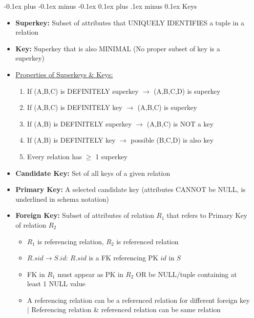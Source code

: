 \documentclass[landscape]{article}
\makeatletter
\renewcommand{\subsection}{\@startsection{subsection}{2}{0mm}%
  {-0.1ex plus -0.1ex minus -0.1ex}%
  {0.1ex plus .1ex minus 0.1ex}%
{\normalfont\scriptsize\bfseries}}
\makeatother
\begin{document}
\begin{multicols*}{5}
    \subsection{Keys}
    \begin{itemize}
      \item \textbf{Superkey:} Subset of attributes that UNIQUELY IDENTIFIES  a tuple in a relation
      \item \textbf{Key:} Superkey that is also MINIMAL (No proper subset of key is a superkey)
      \item \underline{Properties of Superkeys \& Keys:}
      \begin{enumerate}
        \item If (A,B,C) is DEFINITELY superkey $\rightarrow$ (A,B,C,D) is superkey
        \item If (A,B,C) is DEFINITELY key $\rightarrow$ (A,B,C) is superkey
        \item If (A,B) is DEFINITELY superkey $\rightarrow$ (A,B,C) is NOT a key
        \item If (A,B) is DEFINITELY key $\rightarrow$ possible (B,C,D) is also key
        \item Every relation has $\geq$ 1 superkey
      \end{enumerate}
      \item \textbf{Candidate Key:} Set of all keys of a given relation
      \item \textbf{Primary Key:} A selected candidate key (attributes CANNOT be NULL, is underlined in schema notation)
      \item \textbf{Foreign Key:} Subset of attributes of relation $R_1$ that refers to Primary Key of relation $R_2$
      \begin{itemize}
        \item $R_1$ is referencing relation, $R_2$ is referenced relation
        \item $R.sid \rightarrow S.id$: $R.sid$ is a FK referencing PK $id$ in $S$
        \item FK in $R_1$ must appear as PK in $R_2$ OR be NULL/tuple containing at least 1 NULL value
        \item A referencing relation can be a referenced relation for different foreign key $\vert$ Referencing relation \& referenced relation can be same relation
      \end{itemize}
    \end{itemize}
  \end{multicols*}
\end{document}
